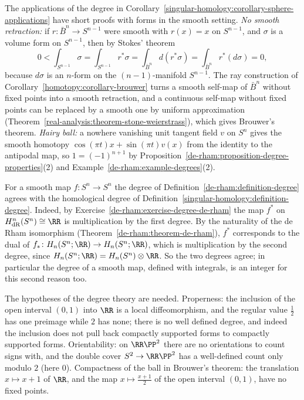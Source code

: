 \begin{remark}\label{de-rham:remark-degree-applications}
The applications of the degree in Corollary~\ref{singular-homology:corollary-sphere-applications} have short proofs with forms in the smooth setting. \emph{No smooth retraction:} if $r \colon \bar B^n \to S^{n-1}$ were smooth with $r(x) = x$ on $S^{n-1}$, and
$\sigma$ is a volume form on $S^{n-1}$, then by Stokes' theorem
\[
0 < \int_{S^{n-1}}\sigma = \int_{S^{n-1}}r^*\sigma = \int_{\bar B^n}d(r^*\sigma) = \int_{\bar B^n}r^*(d\sigma) = 0,
\]
because $d\sigma$ is an $n$-form on the $(n-1)$-manifold $S^{n-1}$. The ray construction of Corollary~\ref{homotopy:corollary-brouwer} turns a smooth self-map of $\bar B^n$ without fixed points into a smooth retraction, and a continuous self-map
without fixed points can be replaced by a smooth one by uniform approximation (Theorem~\ref{real-analysis:theorem-stone-weierstrass}), which gives Brouwer's theorem. \emph{Hairy ball:} a nowhere vanishing unit tangent field $v$ on $S^n$
gives the smooth homotopy $\cos(\pi t)x + \sin(\pi t)v(x)$ from the identity to the antipodal map, so $1 = (-1)^{n+1}$ by Proposition~\ref{de-rham:proposition-degree-properties}(2) and Example~\ref{de-rham:example-degrees}(2).
\end{remark}

\begin{remark}\label{de-rham:remark-degree-comparison}
For a smooth map $f \colon S^n \to S^n$ the degree of Definition~\ref{de-rham:definition-degree} agrees with the homological degree of Definition~\ref{singular-homology:definition-degree}. Indeed, by Exercise~\ref{de-rham:exercise-degree-de-rham} the map $f^*$ on $H^n_{\mathrm{dR}}(S^n) \cong \RR$ is multiplication by the first degree. By the naturality of the de Rham isomorphism (Theorem~\ref{de-rham:theorem-de-rham}), $f^*$ corresponds to the dual of $f_* \colon H_n(S^n; \RR) \to H_n(S^n; \RR)$, which is multiplication by the second degree, since $H_n(S^n; \RR) = H_n(S^n) \otimes \RR$. So the two degrees agree; in particular the degree of a smooth map, defined with integrals, is an integer for this second reason too.
\end{remark}

\begin{counterexample}\label{de-rham:counterexample-degree}
The hypotheses of the degree theory are needed. Properness: the inclusion of the open interval $(0, 1)$ into $\RR$ is a local diffeomorphism, and the regular value $\frac12$ has one preimage while $2$ has none; there is no well
defined degree, and indeed the inclusion does not pull back compactly supported forms to compactly supported forms. Orientability: on $\RR\PP^2$ there are no orientations to count signs with, and the double cover
$S^2 \to \RR\PP^2$ has a well-defined count only modulo $2$ (here $0$). Compactness of the ball in Brouwer's theorem: the translation $x \mapsto x + 1$ of $\RR$, and the map $x \mapsto \frac{x+1}{2}$ of the open interval $(0, 1)$, have no fixed
points.
\end{counterexample}

